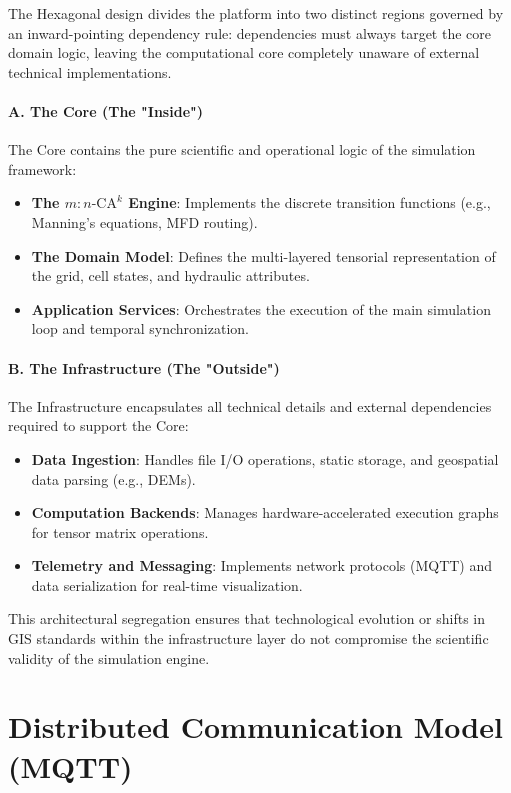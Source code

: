 The Hexagonal design divides the platform into two distinct regions governed by an inward-pointing dependency rule: dependencies must always target the core domain logic, leaving the computational core completely unaware of external technical implementations.

\paragraph{A. The Core (The "Inside")}
The Core contains the pure scientific and operational logic of the simulation framework:
\begin{itemize}
    \item \textbf{The $m:n\text{-CA}^k$ Engine}: Implements the discrete transition functions (e.g., Manning's equations, MFD routing).
    \item \textbf{The Domain Model}: Defines the multi-layered tensorial representation of the grid, cell states, and hydraulic attributes.
    \item \textbf{Application Services}: Orchestrates the execution of the main simulation loop and temporal synchronization.
\end{itemize}

\paragraph{B. The Infrastructure (The "Outside")}
The Infrastructure encapsulates all technical details and external dependencies required to support the Core:
\begin{itemize}
    \item \textbf{Data Ingestion}: Handles file I/O operations, static storage, and geospatial data parsing (e.g., DEMs).
    \item \textbf{Computation Backends}: Manages hardware-accelerated execution graphs for tensor matrix operations.
    \item \textbf{Telemetry and Messaging}: Implements network protocols (MQTT) and data serialization for real-time visualization.
\end{itemize}
This architectural segregation ensures that technological evolution or shifts in GIS standards within the infrastructure layer do not compromise the scientific validity of the simulation engine.



\section{Distributed Communication Model (MQTT)}
\label{sec:distributed_communication_model}

